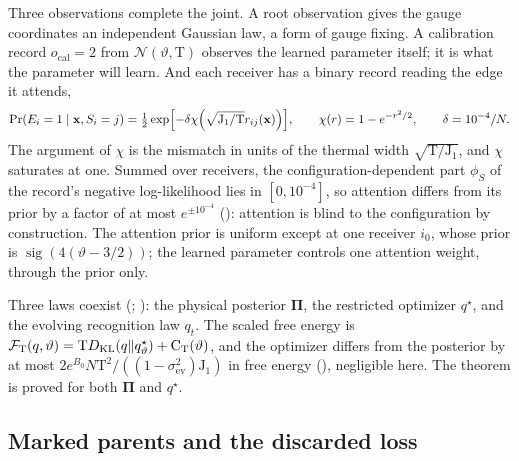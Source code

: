 Three observations complete the joint. A root observation gives the gauge coordinates an independent
Gaussian law, a form of gauge fixing. A calibration record \(o_{\mathrm{cal}}=2\) from
\(\mathcal N(\vartheta,\mathrm T)\) observes the learned parameter itself; it is what the parameter will
learn. And each receiver has a binary record reading the edge it attends,
\[
\Pr(E_i=1\mid\mathbf x,S_i=j)=\tfrac12\exp\Bigl[-\delta\chi\Bigl(\sqrt{\mathrm J_1/\mathrm T}r_{ij}(\mathbf x)\Bigr)\Bigr],
\qquad \chi(r)=1-e^{-r^2/2},\qquad \delta=10^{-4}/N .
\]
The argument of \(\chi\) is the mismatch in units of the thermal width \(\sqrt{\mathrm T/\mathrm J_1}\), and
\(\chi\) saturates at one. Summed over receivers, the configuration-dependent part \(\phi_S\) of the record's
negative log-likelihood lies in \([0,10^{-4}]\), so attention differs from its prior by a factor of at most \(e^{\pm10^{-4}}\)
(): attention is blind to the configuration by construction. The
attention prior is uniform except at one receiver \(i_0\), whose prior is
\(\operatorname{sig}(4(\vartheta-3/2))\); the learned parameter controls one attention weight, through the
prior only.

Three laws coexist (; ): the physical posterior
\(\boldsymbol\Pi\), the restricted optimizer \(q^\star\), and the evolving recognition law \(q_t\). The
scaled free energy is
\(\mathcal F_{\mathrm T}(q,\vartheta)=\mathrm TD_{\mathrm{KL}}(q\Vert q^\star_\vartheta)+\mathrm C_{\mathrm T}(\vartheta)\),
and the optimizer differs from the posterior by at most
\(2e^{B_0}N\mathrm T^2/((1-\sigma^2_{\mathrm{ev}})\mathrm J_1)\) in free energy
(), negligible here. The theorem is proved for both
\(\boldsymbol\Pi\) and \(q^\star\).

\subsection{Marked parents and the discarded loss}
\label{comp:ch13-parents}


